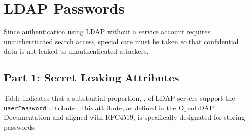 \section{LDAP Passwords}


Since authentication using \gls{LDAP} without a service account requires unauthenticated search access, special care must be taken so that confidential data is not leaked to unauthenticated attackers.

\subsection{Part 1: Secret Leaking Attributes}

Table  indicates that a substantial proportion, , of LDAP servers support the \texttt{userPassword} attribute. This attribute, as defined in the OpenLDAP Documentation and aligned with RFC4519, is specifically designated for storing passwords.

